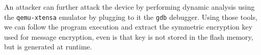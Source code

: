 \documentclass[conference]{IEEEtran}
\begin{document}
An attacker can further attack the device by performing dynamic analysis using the \texttt{qemu-xtensa} emulator
by plugging to it the \texttt{gdb} debugger. 
Using those tools, we can follow the program execution and extract the symmetric encryption key used for message encryption, 
even is that key is not stored in the flash memory, but is generated at runtime.
\end{document}
